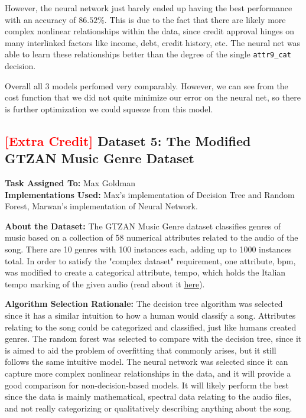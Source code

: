 \documentclass{article}
\begin{document}
However, the neural network just barely ended up having the best performance with an accuracy of $86.52\%$. 
This is due to the fact that there are likely more complex nonlinear relationships within the data, since credit approval hinges on many interlinked factors
like income, debt, credit history, etc. The neural net was able to learn these relationships better than the degree of the single \verb|attr9_cat| decision.

Overall all 3 models perfomed very comparably. However, we can see from the cost function that we did not quite minimize our error on the neural net, so there is further optimization we could squeeze from this model.


\newpage




\subsection{\textcolor{red}{\textbf{[Extra Credit]}} Dataset 5: The Modified GTZAN Music Genre Dataset}

\textbf{Task Assigned To:} Max Goldman \\
\textbf{Implementations Used:} Max's implementation of Decision Tree and Random Forest, Marwan's implementation of Neural Network.

\noindent\textbf{About the Dataset:} The GTZAN Music Genre dataset classifies genres of music based on a collection of 58 numerical attributes related to the audio of the song. 
There are 10 genres with 100 instances each, adding up to 1000 instances total. 
In order to satisfy the "complex dataset" requirement, one attribute, bpm, was modified to create a categorical attribute, tempo, which holds the Italian tempo marking of the given audio (read about it \href{https://www.musicca.com/musical-terms}{here}).

\noindent\textbf{Algorithm Selection Rationale:}
The decision tree algorithm was selected since it has a similar intuition to how a human would classify a song. Attributes relating to the song could be categorized and classified, just like humans created genres.
The random forest was selected to compare with the decision tree, since it is aimed to aid the problem of overfitting that commonly arises, but it still follows the same intuitive model.
The neural network was selected since it can capture more complex nonlinear relationships in the data, and it will provide a good comparison for non-decision-based models.
It will likely perform the best since the data is mainly mathematical, spectral data relating to the audio files, and not really categorizing or qualitatively describing anything about the song.
\end{document}
